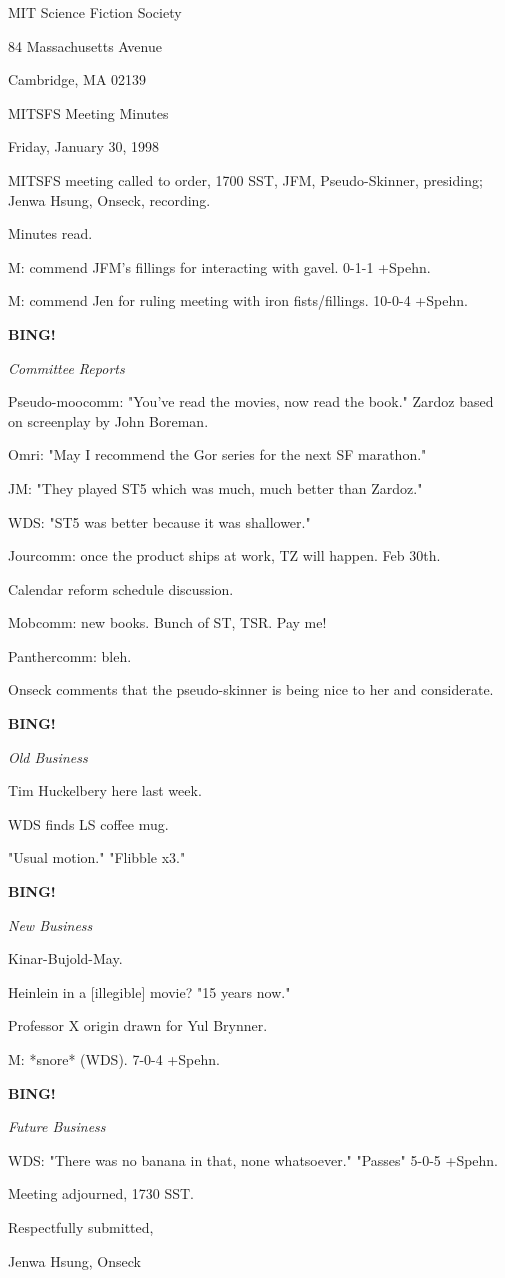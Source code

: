 \documentclass[12pt]{article}
\newcommand{\bing}{{\bf BING!} }
\newcommand{\goto}[1]{\bing \vskip 12pt \centerline{{\em{#1}}}}
\begin{document}
\begin{center}

MIT Science Fiction Society 

84 Massachusetts Avenue

Cambridge, MA 02139

\vspace{12pt}

MITSFS Meeting Minutes 

Friday, January 30, 1998

\end{center}
 
\vspace{18pt}

\setlength{\parskip}{6pt}

\noindent
MITSFS meeting called to order, 1700 SST,
JFM, Pseudo-Skinner, presiding; Jenwa Hsung, Onseck, recording.

Minutes read.

M: commend JFM's fillings for interacting with gavel. 0-1-1 +Spehn.

M: commend Jen for ruling meeting with iron fists/fillings. 10-0-4 +Spehn.

\goto{Committee Reports}

Pseudo-moocomm: "You've read the movies, now read the book." Zardoz based on screenplay by John Boreman.

Omri: "May I recommend the Gor series for the next SF marathon."

JM: "They played ST5 which was much, much better than Zardoz."

WDS: "ST5 was better because it was shallower."

Jourcomm: once the product ships at work, TZ will happen. Feb 30th.

Calendar reform schedule discussion.

Mobcomm: new books. Bunch of ST, TSR. Pay me!

Panthercomm: bleh.

Onseck comments that the pseudo-skinner is being nice to her and considerate.

\goto{Old Business}

Tim Huckelbery here last week.

WDS finds LS coffee mug.

"Usual motion." "Flibble x3."

\goto{New Business}

Kinar-Bujold-May.

Heinlein in a [illegible] movie? "15 years now."

Professor X origin drawn for Yul Brynner.

M: *snore* (WDS). 7-0-4 +Spehn.

\goto{Future Business}

WDS: "There was no banana in that, none whatsoever." "Passes" 5-0-5 +Spehn.

\vspace{12pt}

\noindent
Meeting adjourned, 1730 SST.

\vspace{18pt}

\centerline{Respectfully submitted,}
\centerline{Jenwa Hsung, Onseck}
\end{document}
